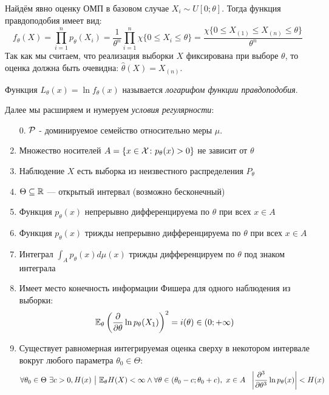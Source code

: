 \begin{example}
	Найдём явно оценку ОМП в базовом случае $X_i \sim U[0; \theta]$. Тогда функция правдоподобия имеет вид:
	\[
		f_\theta(X) = \prod_{i = 1}^n p_\theta(X_i) = \frac{1}{\theta^n} \prod_{i = 1}^n \chi\{0 \le X_i \le \theta\} = \frac{\chi\{0 \le X_{(1)} \le X_{(n)} \le \theta\}}{\theta^n}
	\]
	Так как мы считаем, что реализация выборки $X$ фиксирована при выборе $\theta$, то оценка должна быть очевидна: $\hat{\theta}(X) = X_{(n)}$.
\end{example}

\begin{definition}
	Функция $L_\theta(x) = \ln f_\theta(x)$ называется \textit{логарифом функции правдоподобия}.
\end{definition}

\begin{note}
	Далее мы расширяем и нумеруем \textit{условия регулярности}:
	\begin{enumerate}
		\item[0.] $\mathcal{P}$ - доминируемое семейство относительно меры $\mu$.
		
		\item Множество носителей $A = \{x \in \mathcal{X} \colon p_\theta(x) > 0\}$ не зависит от $\theta$
		
		\item Наблюдение $X$ есть выборка из неизвестного распределения $P_\theta$
		
		\item $\Theta \subseteq \mathbb{R}$ --- открытый интервал (возможно бесконечный)
		
		\item Функция $p_\theta(x)$ непрерывно дифференцируема по $\theta$ при всех $x \in A$
		
		\item Функция $p_\theta(x)$ трижды непрерывно дифференцируема по $\theta$ при всех $x \in A$
		
		\item Интеграл $\int_A p_\theta(x)d\mu(x)$ трижды дифференцируем по $\theta$ под знаком интеграла
		
		\item Имеет место конечность информации Фишера для одного наблюдения из выборки:
		\[
			\mathbb{E}_\theta\left(\frac{\partial }{\partial \theta} \ln p_\theta(X_1)\right)^2 = i(\theta) \in (0; +\infty)
		\]
		
		\item Существует равномерная интегрируемая оценка сверху в некотором интервале вокруг любого параметра $\theta_0 \in \Theta$:
		\[
			\forall \theta_0 \in \Theta\ \exists c > 0, H(x) \ \big|\  \mathbb{E}_\theta H(X) < \infty \wedge \forall \theta \in (\theta_0 - c; \theta_0 + c),\ x \in A\ \ \left|\frac{\partial ^3}{\partial \theta^3} \ln p_\theta(x)\right| < H(x)
		\]
	\end{enumerate}
\end{note}

